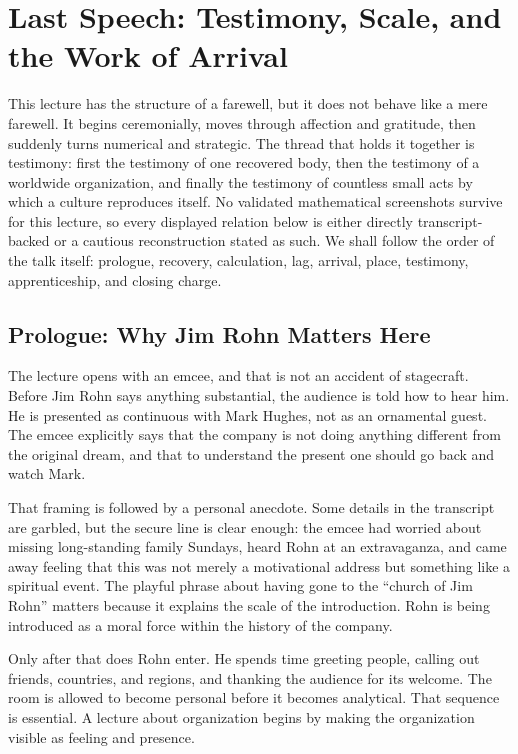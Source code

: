 \chapter{Last Speech: Testimony, Scale, and the Work of Arrival}

This lecture has the structure of a farewell, but it does not behave like a mere farewell. It begins ceremonially, moves through affection and gratitude, then suddenly turns numerical and strategic. The thread that holds it together is testimony: first the testimony of one recovered body, then the testimony of a worldwide organization, and finally the testimony of countless small acts by which a culture reproduces itself. No validated mathematical screenshots survive for this lecture, so every displayed relation below is either directly transcript-backed or a cautious reconstruction stated as such. We shall follow the order of the talk itself: prologue, recovery, calculation, lag, arrival, place, testimony, apprenticeship, and closing charge.

\section{Prologue: Why Jim Rohn Matters Here}

The lecture opens with an emcee, and that is not an accident of stagecraft. Before Jim Rohn says anything substantial, the audience is told how to hear him. He is presented as continuous with Mark Hughes, not as an ornamental guest. The emcee explicitly says that the company is not doing anything different from the original dream, and that to understand the present one should go back and watch Mark.

That framing is followed by a personal anecdote. Some details in the transcript are garbled, but the secure line is clear enough: the emcee had worried about missing long-standing family Sundays, heard Rohn at an extravaganza, and came away feeling that this was not merely a motivational address but something like a spiritual event. The playful phrase about having gone to the ``church of Jim Rohn'' matters because it explains the scale of the introduction. Rohn is being introduced as a moral force within the history of the company.

Only after that does Rohn enter. He spends time greeting people, calling out friends, countries, and regions, and thanking the audience for its welcome. The room is allowed to become personal before it becomes analytical. That sequence is essential. A lecture about organization begins by making the organization visible as feeling and presence.

